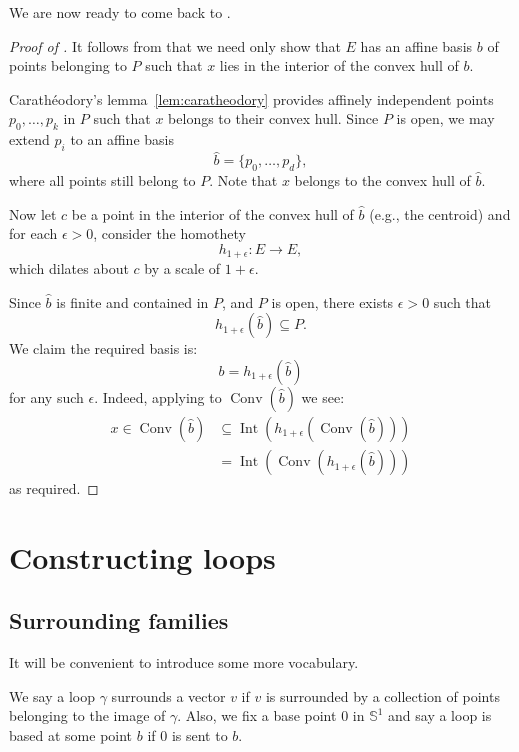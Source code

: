 \documentclass[10pt,a4paper]{article}
\newcommand{\co}{\!:}
\DeclareMathOperator{\Int}{Int} %
\DeclareMathOperator{\Conv}{Conv} %
\newcommand{\uses}[1]{}
\newcommand{\proves}[1]{}
\newcommand{\lean}[1]{}
\newcommand{\leanok}{}
\begin{document}
We are now ready to come back to .

\begin{proof}[Proof of ]\proves{prop:surrounded_by_open}
  \leanok
  \uses{lem:caratheodory,lem:interior_chab,lem:int_homothety_cvx}
  It follows from  that we need only show that $E$
  has an affine basis $b$ of points belonging to $P$ such that $x$ lies in
  the interior of the convex hull of $b$.

  Carathéodory's lemma~\ref{lem:caratheodory} provides affinely independent
  points $p_0, \dots, p_k$ in $P$ such that $x$ belongs to their convex
  hull. Since $P$ is open, we may extend $p_i$ to an affine basis
  \[
    \hat b = \{p_0, \ldots, p_d\},
  \]
  where all points still belong to $P$.
  Note that $x$ belongs to the convex hull of $\hat b$.

  Now let $c$ be a point in the interior of the convex hull of $\hat b$
  (e.g., the centroid) and for each $\epsilon > 0$, consider the homothety
  \[
    h_{1+\epsilon} \co E \to E,
  \]
  which dilates about $c$ by a scale of $1 + \epsilon$.

  Since $\hat b$ is finite and contained in $P$, and $P$ is open, there exists
  $\epsilon > 0$ such that
  \[
    h_{1+\epsilon} (\hat b) \subseteq P.
  \]
  We claim the required basis is:
  \[
    b = h_{1+\epsilon} (\hat b)
  \]
  for any such $\epsilon$. Indeed, applying
   to $\Conv(\hat b)$ we see:
  \begin{align*}
    x \in \Conv(\hat b) &\subseteq \Int (h_{1+\epsilon} (\Conv(\hat b)))\\
                  &= \Int (\Conv(h_{1+\epsilon} (\hat b)))
  \end{align*}
  as required.
\end{proof}


\section{Constructing loops}

\subsection{Surrounding families}
\label{sub:surrounding_families}

It will be convenient to introduce some more vocabulary.

\begin{definition}
  \label{def:surrounds}
  \uses{def:loop, def:surrounds_points}
  \lean{Loop.Surrounds}
  \leanok
  We say a loop $γ$ surrounds a vector $v$ if $v$ is surrounded
  by a collection of points belonging to the image of $γ$.
  Also, we fix a base point $0$ in $𝕊^1$ and say a loop is based at some
  point $b$ if $0$ is sent to $b$.
\end{definition}
\end{document}
